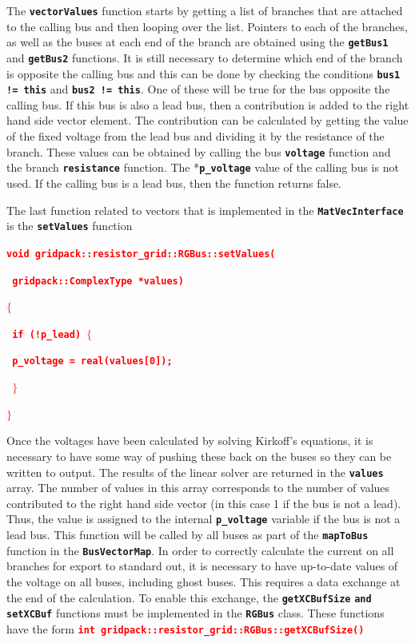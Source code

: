\documentclass[12pt]{report} %
\begin{document}
The \texttt{\textbf{vectorValues}} function starts by getting a list of branches that are attached to the calling bus and then looping over the list. Pointers to each of the branches, as well as the buses at each end of the branch are obtained using the \texttt{\textbf{getBus1}} and \texttt{\textbf{getBus2}} functions. It is still necessary to determine which end of the branch is opposite the calling bus and this can be done by checking the conditions \texttt{\textbf{bus1 != this}} and \texttt{\textbf{bus2 != this}}. One of these will be true for the bus opposite the calling bus. If this bus is also a lead bus, then a contribution is added to the right hand side vector element. The contribution can be calculated by getting the value of the fixed voltage from the lead bus and dividing it by the resistance of the branch. These values can be obtained by calling the bus \texttt{\textbf{voltage}} function and the branch \texttt{\textbf{resistance}} function. The *\texttt{\textbf{p\_voltage}} value of the calling bus is not used. If the calling bus is a lead bus, then the function returns false.

The last function related to vectors that is implemented in the \texttt{\textbf{MatVecInterface}} is the \texttt{\textbf{setValues}} function

\textcolor{red}{\texttt{\textbf{void gridpack::resistor\_grid::RGBus::setValues(}}}

\textcolor{red}{\texttt{\textbf{   gridpack::ComplexType *values)}}}

\textcolor{red}{\texttt{\textbf{$\boldsymbol{\mathrm{\{}}$}}}

\textcolor{red}{\texttt{\textbf{  if (!p\_lead) $\boldsymbol{\mathrm{\{}}$}}}

\textcolor{red}{\texttt{\textbf{    p\_voltage = real(values[0]);}}}

\textcolor{red}{\texttt{\textbf{  $\boldsymbol{\mathrm{\}}}$}}}

\textcolor{red}{\texttt{\textbf{$\boldsymbol{\mathrm{\}}}$}}}

Once the voltages have been calculated by solving Kirkoff's equations, it is necessary to have some way of pushing these back on the buses so they can be written to output. The results of the linear solver are returned in the \texttt{\textbf{values}} array. The number of values in this array corresponds to the number of values contributed to the right hand side vector (in this case 1 if the bus is not a lead). Thus, the value is assigned to the internal \texttt{\textbf{p\_voltage}} variable if the bus is not a lead bus. This function will be called by all buses as part of the \texttt{\textbf{mapToBus}} function in the \texttt{\textbf{BusVectorMap}}.
In order to correctly calculate the current on all branches for export to standard out, it is necessary to have up-to-date values of the voltage on all buses, including ghost buses. This requires a data exchange at the end of the calculation. To enable this exchange, the \texttt{\textbf{getXCBufSize}} \texttt{\textbf{and setXCBuf}} functions must be implemented in the \texttt{\textbf{RGBus}} class. These functions have the form
\textcolor{red}{\texttt{\textbf{int gridpack::resistor\_grid::RGBus::getXCBufSize()}}}
\end{document}
